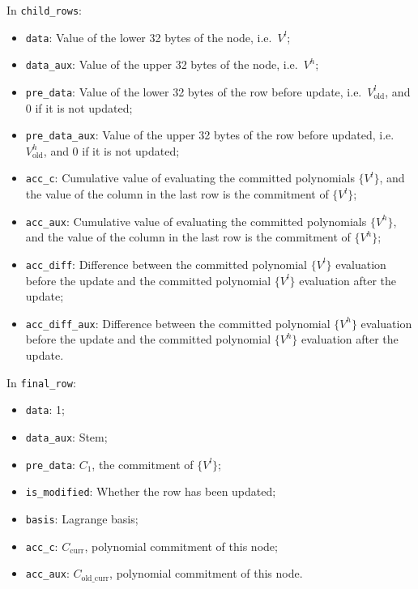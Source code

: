 In \verb|child_rows|:
\begin{itemize}
    \item \verb|data|: Value of the lower 32 bytes of the node, i.e.\ $V^l$;
    \item \verb|data_aux|: Value of the upper 32 bytes of the node, i.e.\ $V^h$;
    \item \verb|pre_data|: Value of the lower 32 bytes of the row before update, i.e.\ $V^l_\text{old}$, and 0 if it is not updated;
    \item \verb|pre_data_aux|: Value of the upper 32 bytes of the row before updated, i.e.\ $V^h_\text{old}$, and 0 if it is not updated;
    \item \verb|acc_c|: Cumulative value of evaluating the committed polynomials $\{V^l\}$, and the value of the column in the last row is the commitment of $\{V^l\}$;
    \item \verb|acc_aux|: Cumulative value of evaluating the committed polynomials $\{V^h\}$, and the value of the column in the last row is the commitment of $\{V^h\}$;
    \item \verb|acc_diff|: Difference between the committed polynomial $\{V^l\}$ evaluation before the update and the committed polynomial $\{V^l\}$ evaluation after the update;
    \item \verb|acc_diff_aux|: Difference between the committed polynomial $\{V^h\}$ evaluation before the update and the committed polynomial $\{V^h\}$ evaluation after the update.
\end{itemize}

In \verb|final_row|:
\begin{itemize}
    \item \verb|data|: 1;
    \item \verb|data_aux|: Stem;
    \item \verb|pre_data|: $C_1$, the commitment of $\{V^l\}$;
    \item \verb|is_modified|: Whether the row has been updated;
    \item \verb|basis|: Lagrange basis;
    \item \verb|acc_c|: $C_\text{curr}$, polynomial commitment of this node;
    \item \verb|acc_aux|: $C_\text{old\_curr}$, polynomial commitment of this node.
\end{itemize}

